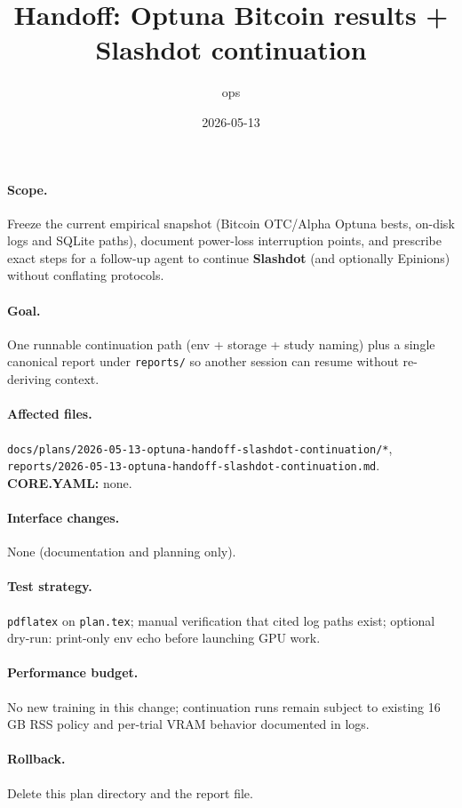 \documentclass{article}
\title{Handoff: Optuna Bitcoin results + Slashdot continuation}
\author{ops}
\date{2026-05-13}
\begin{document}
\maketitle

\paragraph{Scope.}
Freeze the current empirical snapshot (Bitcoin OTC/Alpha Optuna bests,
on-disk logs and SQLite paths), document power-loss interruption points, and
prescribe exact steps for a follow-up agent to continue \textbf{Slashdot}
(and optionally Epinions) without conflating protocols.

\paragraph{Goal.}
One runnable continuation path (env + storage + study naming) plus a
single canonical report under \texttt{reports/} so another session can
resume without re-deriving context.

\paragraph{Affected files.}
\texttt{docs/plans/2026-05-13-optuna-handoff-slashdot-continuation/*},
\texttt{reports/2026-05-13-optuna-handoff-slashdot-continuation.md}.
\textbf{CORE.YAML:} none.

\paragraph{Interface changes.}
None (documentation and planning only).

\paragraph{Test strategy.}
\texttt{pdflatex} on \texttt{plan.tex}; manual verification that cited log
paths exist; optional dry-run: print-only env echo before launching GPU work.

\paragraph{Performance budget.}
No new training in this change; continuation runs remain subject to existing
16\,GB RSS policy and per-trial VRAM behavior documented in logs.

\paragraph{Rollback.}
Delete this plan directory and the report file.
\end{document}
